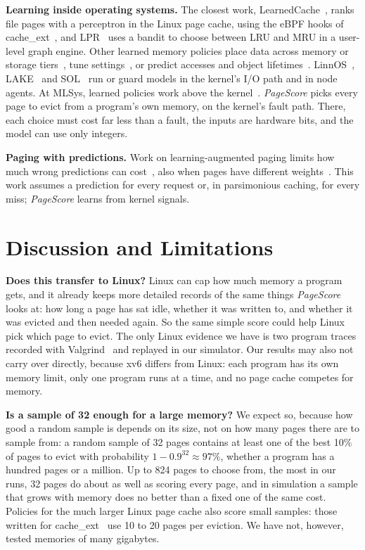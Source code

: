 \documentclass{article}
\DeclareRobustCommand{\pagescore}{\textit{PageScore}}
\newcommand{\finding}[1]{\textbf{#1}\hspace{0.4em}}
\begin{document}
\finding{Learning inside operating systems.} The closest work, LearnedCache~\citep{qi2026learnedcache}, ranks file pages with a perceptron in the Linux page cache, using the eBPF hooks of cache\_ext~\citep{zussman2025cacheext}, and LPR~\citep{kim2025lpr} uses a bandit to choose between LRU and MRU in a user-level graph engine. Other learned memory policies place data across memory or storage tiers~\citep{doudali2019kleio,singh2022sibyl,ramaswamy2026xtier}, tune settings~\citep{lagarcavilla2019farmemory,akgun2021kml}, or predict accesses and object lifetimes~\citep{hashemi2018learning,maas2020llama,qiu2021rmt}. LinnOS~\citep{hao2020linnos}, LAKE~\citep{fingler2023lake} and SOL~\citep{wang2022sol} run or guard models in the kernel's I/O path and in node agents. At MLSys, learned policies work above the kernel~\citep{mallick2022matchmaker,barbalho2023vmalloc,qiu2024flash,ling2025lava,wang2025protorail,yang2025byom,zhao2026catur,gohil2026uncertain}. \pagescore{} picks every page to evict from a program's own memory, on the kernel's fault path. There, each choice must cost far less than a fault, the inputs are hardware bits, and the model can use only integers.

\finding{Paging with predictions.} Work on learning-augmented paging limits how much wrong predictions can cost~\citep{rohatgi2020,wei2020,lykouris2021jacm,im2022parsimonious}, also when pages have different weights~\citep{bansal2022weighted}. This work assumes a prediction for every request or, in parsimonious caching, for every miss; \pagescore{} learns from kernel signals.
\section{Discussion and Limitations}
\label{sec:discussion}

\finding{Does this transfer to Linux?} Linux can cap how much memory a program gets, and it already keeps more detailed records of the same things \pagescore{} looks at: how long a page has sat idle, whether it was written to, and whether it was evicted and then needed again. So the same simple score could help Linux pick which page to evict. The only Linux evidence we have is two program traces recorded with Valgrind~\citep{nethercote2007valgrind} and replayed in our simulator. Our results may also not carry over directly, because xv6 differs from Linux: each program has its own memory limit, only one program runs at a time, and no page cache competes for memory.

\finding{Is a sample of 32 enough for a large memory?} We expect so, because how good a random sample is depends on its size, not on how many pages there are to sample from: a random sample of 32 pages contains at least one of the best 10\% of pages to evict with probability $1-0.9^{32}\approx 97\%$, whether a program has a hundred pages or a million. Up to 824 pages to choose from, the most in our runs, 32 pages do about as well as scoring every page, and in simulation a sample that grows with memory does no better than a fixed one of the same cost. Policies for the much larger Linux page cache also score small samples: those written for cache\_ext~\citep{zussman2025cacheext} use 10 to 20 pages per eviction. We have not, however, tested memories of many gigabytes.
\end{document}
